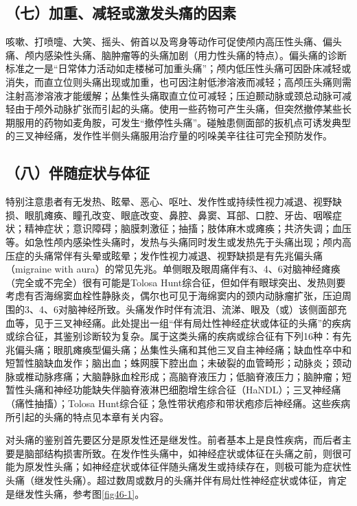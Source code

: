 \subsection{（七）加重、减轻或激发头痛的因素}

咳嗽、打喷嚏、大笑、摇头、俯首以及弯身等动作可促使颅内高压性头痛、偏头痛、颅内感染性头痛、脑肿瘤等的头痛加剧（用力性头痛的特点）。偏头痛的诊断标准之一是“日常体力活动如走楼梯可加重头痛”；颅内低压性头痛可因卧床减轻或消失，而直立位则头痛出现或加重，也可因注射低渗溶液而减轻；高颅压头痛则需注射高渗溶液才能缓解；丛集性头痛取直立位可减轻；压迫颞动脉或颈总动脉可减轻由于颅外动脉扩张而引起的头痛。使用一些药物可产生头痛，但突然撤停某些长期服用的药物如麦角胺，可发生“撤停性头痛”。碰触患侧面部的扳机点可诱发典型的三叉神经痛，发作性半侧头痛服用治疗量的吲哚美辛往往可完全预防发作。

\subsection{（八）伴随症状与体征}

特别注意患者有无发热、眩晕、恶心、呕吐、发作性或持续性视力减退、视野缺损、眼肌瘫痪、瞳孔改变、眼底改变、鼻腔、鼻窦、耳部、口腔、牙齿、咽喉症状；精神症状；意识障碍；脑膜刺激征；抽搐；肢体麻木或瘫痪；共济失调；血压等。如急性颅内感染性头痛时，发热与头痛同时发生或发热先于头痛出现；颅内高压症的头痛常伴有头晕或眩晕；发作性视力减退、视野缺损是有先兆偏头痛（migraine
with
aura）的常见先兆。单侧眼及眼周痛伴有3、4、6对脑神经瘫痪（完全或不完全）很有可能是Tolosa
Hunt综合征，但如伴有眼球突出、发热则要考虑有否海绵窦血栓性静脉炎，偶尔也可见于海绵窦内的颈内动脉瘤扩张，压迫周围的3、4、6对脑神经所致。头痛发作时伴有流泪、流涕、眼及（或）该侧面部充血等，见于三叉神经痛。此处提出一组“伴有局灶性神经症状或体征的头痛”的疾病或综合征，其鉴别诊断较为复杂。属于这类头痛的疾病或综合征有下列16种：有先兆偏头痛；眼肌瘫痪型偏头痛；丛集性头痛和其他三叉自主神经痛；缺血性卒中和短暂性脑缺血发作；脑出血；蛛网膜下腔出血；未破裂的血管畸形；动脉炎；颈动脉或椎动脉疼痛；大脑静脉血栓形成；高脑脊液压力；低脑脊液压力；脑肿瘤；短暂性头痛和神经功能缺失伴脑脊液淋巴细胞增生综合征（HaNDL）；三叉神经痛（痛性抽搐）；Tolosa
Hunt综合征；急性带状疱疹和带状疱疹后神经痛。这些疾病所引起的头痛的特点见本章有关内容。

对头痛的鉴别首先要区分是原发性还是继发性。前者基本上是良性疾病，而后者主要是脑部结构损害所致。在发作性头痛中，如神经症状或体征在头痛之前，则很可能为原发性头痛；如神经症状或体征伴随头痛发生或持续存在，则极可能为症状性头痛（继发性头痛）。超过数周或数月的头痛并伴有局灶性神经症状或体征，肯定是继发性头痛，参考图\ref{fig46-1}。

